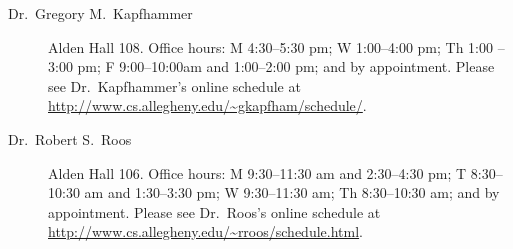 \begin{description}



  \item [Dr.\ Gregory M.\ Kapfhammer] Alden Hall 108. Office hours: M 4:30--5:30 pm; W 1:00--4:00 pm; Th 1:00 -- 3:00
    pm; F 9:00--10:00am and 1:00--2:00 pm; and by appointment. Please see Dr.\ Kapfhammer's online schedule at
    \url{http://www.cs.allegheny.edu/~gkapfham/schedule/}.


  \item [Dr.\ Robert S.\ Roos] Alden Hall 106. Office hours: M 9:30--11:30 am and 2:30--4:30 pm; T  8:30--10:30 am and
    1:30--3:30 pm; W 9:30--11:30 am; Th 8:30--10:30 am; and by appointment.  Please see Dr.\ Roos's online schedule at
    \url{http://www.cs.allegheny.edu/~rroos/schedule.html}.

\end{description}


